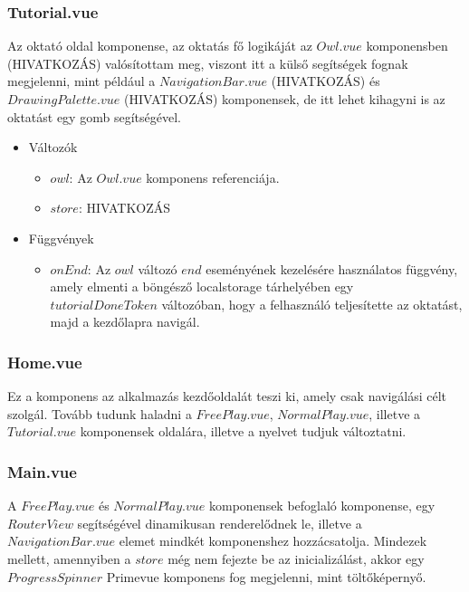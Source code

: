\subsubsection{Tutorial.vue}
Az oktató oldal komponense, az oktatás fő logikáját az $Owl.vue$ komponensben (HIVATKOZÁS) valósítottam meg, viszont itt a külső segítségek fognak megjelenni, mint például a $NavigationBar.vue$ (HIVATKOZÁS) és $DrawingPalette.vue$ (HIVATKOZÁS) komponensek, de itt lehet kihagyni is az oktatást egy gomb segítségével.
\begin{itemize}
    \item Változók
    \begin{itemize}
        \item $owl$: Az $Owl.vue$ komponens referenciája.
        \item $store$: HIVATKOZÁS
    \end{itemize}
    \item Függvények
    \begin{itemize}
        \item $onEnd$: Az $owl$ változó $end$ eseményének kezelésére használatos függvény, amely elmenti a böngésző localstorage tárhelyében egy $tutorialDoneToken$ változóban, hogy a felhasználó teljesítette az oktatást, majd a kezdőlapra navigál.
    \end{itemize}
\end{itemize}

\subsubsection{Home.vue}
Ez a komponens az alkalmazás kezdőoldalát teszi ki, amely csak navigálási célt szolgál. Tovább tudunk haladni a $FreePlay.vue$, $NormalPlay.vue$, illetve a $Tutorial.vue$ komponensek oldalára, illetve a nyelvet tudjuk változtatni.

\subsubsection{Main.vue}
A $FreePlay.vue$ és $NormalPlay.vue$ komponensek befoglaló komponense, egy $RouterView$ segítségével dinamikusan renderelődnek le, illetve a $NavigationBar.vue$ elemet mindkét komponenshez hozzácsatolja. Mindezek mellett, amennyiben a $store$ még nem fejezte be az inicializálást, akkor egy $ProgressSpinner$ Primevue komponens fog megjelenni, mint töltőképernyő.

